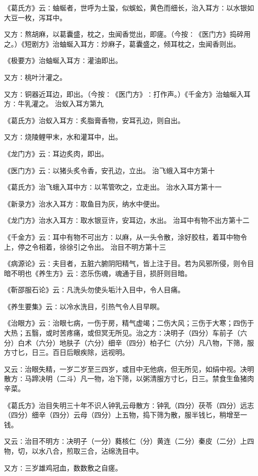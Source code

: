 \documentclass[a4paper,12pt,UTF8,twoside]{ctexbook}
\begin{document}
《葛氏方》云∶蚰蜒者，世呼为土蛩，似蜈蚣，黄色而细长，治入耳方∶以水银如大豆一枚，泻耳中。

又方∶熬胡麻，以葛囊盛，枕之，虫闻香觉出，即瘥。（今按∶《医门方》捣碎用之。）《短剧方》治蚰蜒入耳方∶炒麻子，葛囊盛之，倾耳枕之，虫闻香则出。

《极要方》治蚰蜒入耳方∶灌油即出。

又方∶桃叶汁灌之。

又方∶铜器近耳边，即出。（今按∶《医门方》∶打作声。）《千金方》治蚰蜒入耳方∶牛乳灌之。
治蚁入耳方第九

《葛氏方》治蚁入耳方∶炙脂膏香物，安耳孔边，则自出。

又方∶烧陵鲤甲末，水和灌耳中，出。

《龙门方》云∶耳边炙肉，即出。

《医门方》云∶以猪头炙令香，安孔边，立出。
治飞蛾入耳中方第十

《葛氏方》治飞蛾入耳中方∶以苇管吹之，立走出。
治水入耳方第十一

《新录方》治水入耳方∶取鱼目为灰，纳水中便出。

《龙门方》治水入耳方∶取水银豆许，安耳边，水出。
治耳中有物不出方第十二

《千金方》云∶耳中有物不可出方∶以麻，从一头令散，涂好胶柱，着耳中物令上，停之令相着，徐徐引之令出。
治目不明方第十三

《病源论》云∶夫目者，五脏六腑阴阳精气，皆上注于目。若为风邪所侵，则令目暗不明也《养生方》云∶恣乐伤魂，魂通于目，损肝则目暗。

《靳邵服石论》云∶凡洗头勿使头垢汁入目中，令人目痛。

《养生要集》云∶以冷水洗目，引热气令人目早瞑。

《治眼方》云∶治眼七病，一伤于房，精气虚竭；二伤大风；三伤于大寒；四伤于大热；五翳，或时苦疼痛，或但冥无所见。治之方∶决明子（四分）车前子（六分）白术（六分）地肤子（六分）细辛（四分）柏子仁（六分）凡八物，下筛，服方寸匕，日三。百日后眼疾除，远视明。

又云∶治眼失精，一岁二岁至三四岁，或目中无他病，但无所见，如绢中视。决明散方∶马蹄决明（二斗）凡一物，冶下筛，以粥清服方寸匕，日三。禁食生鱼猪肉辛菜。

《葛氏方》治目失明三十年不识人钟乳云母散方∶钟乳（四分）茯苓（四分）远志（四分）细辛（四分）云母（四分）上五物，捣下筛为散，服半钱匕，稍增至一钱。

又云∶治目不明方∶决明子（一分）蕤核仁（分）黄连（二分）秦皮（二分）上四物，切，以水八合，煎取三合，沾绵洗目中。

又方∶三岁雄鸡冠血，数数敷之自瘥。
\end{document}
